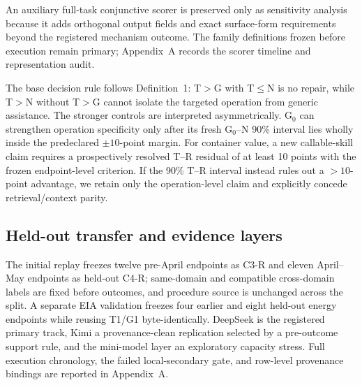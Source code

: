 An auxiliary full-task conjunctive scorer is preserved only as sensitivity analysis because it adds orthogonal output fields and exact surface-form requirements beyond the registered mechanism outcome. The family definitions frozen before execution remain primary; Appendix~A records the scorer timeline and representation audit.

The base decision rule follows Definition~1: T$>$G with T$\leq$N is no repair, while T$>$N without T$>$G cannot isolate the targeted operation from generic assistance. The stronger controls are interpreted asymmetrically. G$_0$ can strengthen operation specificity only after its fresh G$_0$--N 90\% interval lies wholly inside the predeclared $\pm10$-point margin. For container value, a new callable-skill claim requires a prospectively resolved T--R residual of at least 10 points with the frozen endpoint-level criterion. If the 90\% T--R interval instead rules out a $>10$-point advantage, we retain only the operation-level claim and explicitly concede retrieval/context parity.

\subsection{Held-out transfer and evidence layers}
The initial replay freezes twelve pre-April endpoints as C3-R and eleven April--May endpoints as held-out C4-R; same-domain and compatible cross-domain labels are fixed before outcomes, and procedure source is unchanged across the split. A separate EIA validation freezes four earlier and eight held-out energy endpoints while reusing T1/G1 byte-identically. DeepSeek is the registered primary track, Kimi a provenance-clean replication selected by a pre-outcome support rule, and the mini-model layer an exploratory capacity stress. Full execution chronology, the failed local-secondary gate, and row-level provenance bindings are reported in Appendix~A.

